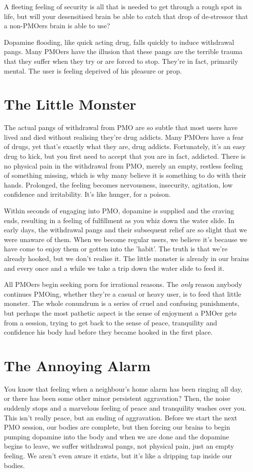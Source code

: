 \documentclass[easypeasy.tex]{subfiles}
\begin{document}
A fleeting feeling of security is all that is needed to get through a rough spot in life, but will your desensitised brain be able to catch that drop of de-stressor that a non-PMOers brain is able to use?

Dopamine flooding, like quick acting drug, falls quickly to induce withdrawal pangs. Many PMOers have the illusion that these pangs are the terrible trauma that they suffer when they try or are forced to stop. They're in fact, primarily mental. The user is feeling deprived of his pleasure or prop.

\section{The Little Monster}
The actual pangs of withdrawal from PMO are so subtle that most users have lived and died without realising they're drug addicts. Many PMOers have a fear of drugs, yet that's exactly what they are, drug addicts. Fortunately, it's an easy drug to kick, but you first need to accept that you are in fact, addicted. There is no physical pain in the withdrawal from PMO, merely an empty, restless feeling of something missing, which is why many believe it is something to do with their hands. Prolonged, the feeling becomes nervousness, insecurity, agitation, low confidence and irritability. It's like hunger, for a poison.

Within seconds of engaging into PMO, dopamine is supplied and the craving ends, resulting in a feeling of fulfillment as you whiz down the water slide. In early days, the withdrawal pangs and their subsequent relief are so slight that we were unaware of them. When we become regular users, we believe it's because we have come to enjoy them or gotten into the 'habit'. The truth is that we're already hooked, but we don't realise it. The little monster is already in our brains and every once and a while we take a trip down the water slide to feed it.

All PMOers begin seeking porn for irrational reasons. The \textit{only} reason anybody continues PMOing, whether they're a casual or heavy user, is to feed that little monster. The whole conundrum is a series of cruel and confusing punishments, but perhaps the most pathetic aspect is the sense of enjoyment a PMOer gets from a session, trying to get back to the sense of peace, tranquility and confidence his body had before they became hooked in the first place.

\section{The Annoying Alarm}
You know that feeling when a neighbour's home alarm has been ringing all day, or there has been some other minor persistent aggravation? Then, the noise suddenly stops and a marvelous feeling of peace and tranquility washes over you. This isn't really peace, but an ending of aggravation. Before we start the next PMO session, our bodies are complete, but then forcing our brains to begin pumping dopamine into the body and when we are done and the dopamine begins to leave, we suffer withdrawal pangs, not physical pain, just an empty feeling. We aren't even aware it exists, but it's like a dripping tap inside our bodies.
\end{document}
